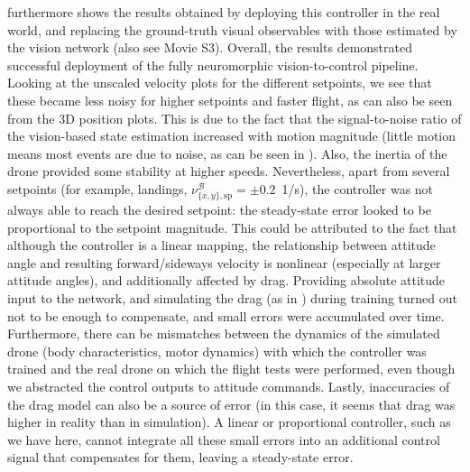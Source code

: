  furthermore shows the results obtained by deploying this controller in the real world, and replacing the ground-truth visual observables with those estimated by the vision network (also see Movie S3). Overall, the results demonstrated successful deployment of the fully neuromorphic vision-to-control pipeline. Looking at the unscaled velocity plots for the different setpoints, we see that these became less noisy for higher setpoints and faster flight, as can also be seen from the 3D position plots. This is due to the fact that the signal-to-noise ratio of the vision-based state estimation increased with motion magnitude (little motion means most events are due to noise, as can be seen in ). Also, the inertia of the drone provided some stability at higher speeds. Nevertheless, apart from several setpoints (for example, landings, $\nu^\mathcal{B}_{\{x,y\},\mathrm{sp}} = \pm0.2$~1/s), the controller was not always able to reach the desired setpoint: the steady-state error looked to be proportional to the setpoint magnitude. This could be attributed to the fact that although the controller is a linear mapping, the relationship between attitude angle and resulting forward/sideways velocity is nonlinear (especially at larger attitude angles), and additionally affected by drag.
Providing absolute attitude input to the network, and simulating the drag (as in \cite{dewagter2022sensing}) during training turned out not to be enough to compensate, and small errors were accumulated over time. Furthermore, there can be mismatches between the dynamics of the simulated drone (body characteristics, motor dynamics) with which the controller was trained and the real drone on which the flight tests were performed, even though we abstracted the control outputs to attitude commands. Lastly, inaccuracies of the drag model can also be a source of error (in this case, it seems that drag was higher in reality than in simulation). A linear or proportional controller, such as we have here, cannot integrate all these small errors into an additional control signal that compensates for them, leaving a steady-state error.
 
